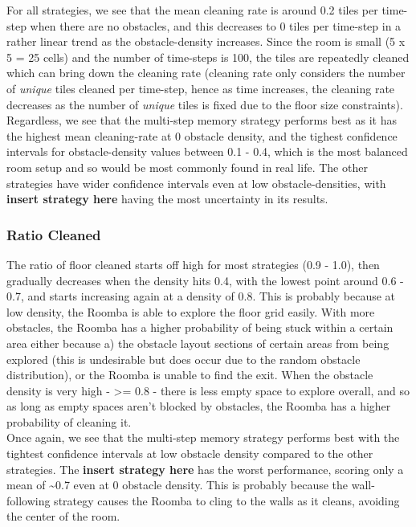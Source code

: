 \documentclass[11pt]{article}
\begin{document}
For all strategies, we see that the mean cleaning rate is around 0.2
tiles per time-step when there are no obstacles, and this decreases to 0
tiles per time-step in a rather linear trend as the obstacle-density
increases. Since the room is small (5 x 5 = 25 cells) and the number of
time-steps is 100, the tiles are repeatedly cleaned which can bring down
the cleaning rate (cleaning rate only considers the number of
\emph{unique} tiles cleaned per time-step, hence as time increases, the
cleaning rate decreases as the number of \emph{unique} tiles is fixed
due to the floor size constraints). Regardless, we see that the
multi-step memory strategy performs best as it has the highest mean
cleaning-rate at 0 obstacle density, and the tighest confidence
intervals for obstacle-density values between 0.1 - 0.4, which is the
most balanced room setup and so would be most commonly found in real
life. The other strategies have wider confidence intervals even at low
obstacle-densities, with \textbf{insert strategy here} having the most
uncertainty in its results.

\subsubsection*{Ratio Cleaned}

The ratio of floor cleaned starts off high for most strategies (0.9 -
1.0), then gradually decreases when the density hits 0.4, with the
lowest point around 0.6 - 0.7, and starts increasing again at a density
of 0.8. This is probably because at low density, the Roomba is able to
explore the floor grid easily. With more obstacles, the Roomba has a
higher probability of being stuck within a certain area either because
a) the obstacle layout sections of certain areas from being explored
(this is undesirable but does occur due to the random obstacle
distribution), or the Roomba is unable to find the exit. When the
obstacle density is very high - \textgreater{}= 0.8 - there is less
empty space to explore overall, and so as long as empty spaces aren't
blocked by obstacles, the Roomba has a higher probability of cleaning
it.\\

Once again, we see that the multi-step memory strategy performs best
with the tightest confidence intervals at low obstacle density compared
to the other strategies. The \textbf{insert strategy here} has the worst
performance, scoring only a mean of \textasciitilde{}0.7 even at 0
obstacle density. This is probably because the wall-following strategy
causes the Roomba to cling to the walls as it cleans, avoiding the
center of the room.
\end{document}
